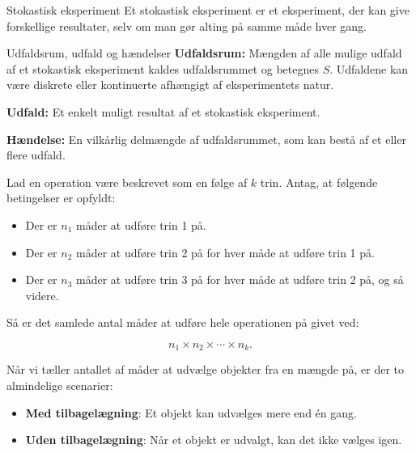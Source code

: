 \begin{definition}{Stokastisk eksperiment}
    Et stokastisk eksperiment er et eksperiment, der kan give forskellige resultater, selv om man gør alting på samme måde hver gang.
\end{definition}

\begin{definition}{Udfaldsrum, udfald og hændelser}
    \textbf{Udfaldsrum:} Mængden af alle mulige udfald af et stokastisk eksperiment kaldes udfaldsrummet og betegnes \( S \). Udfaldene kan være diskrete eller kontinuerte afhængigt af eksperimentets natur.
    
    \textbf{Udfald:} Et enkelt muligt resultat af et stokastisk eksperiment.
    
    \textbf{Hændelse:} En vilkårlig delmængde af udfaldsrummet, som kan bestå af et eller flere udfald.
\end{definition}

\begin{theorem}[Multiplikationsreglen]
    Lad en operation være beskrevet som en følge af $k$ trin. Antag, at følgende betingelser er opfyldt:
    
    \begin{itemize}
        \item Der er $n_1$ måder at udføre trin 1 på.
        \item Der er $n_2$ måder at udføre trin 2 på for hver måde at udføre trin 1 på.
        \item Der er $n_3$ måder at udføre trin 3 på for hver måde at udføre trin 2 på, og så videre.
    \end{itemize}
    
    Så er det samlede antal måder at udføre hele operationen på givet ved:
    
    \[
    n_1 \times n_2 \times \cdots \times n_k.
    \]
\end{theorem}

\begin{definition}
    Når vi tæller antallet af måder at udvælge objekter fra en mængde på, er der to almindelige scenarier:

    \begin{itemize}
        \item \textbf{Med tilbagelægning}: Et objekt kan udvælges mere end én gang.
        \item \textbf{Uden tilbagelægning}: Når et objekt er udvalgt, kan det ikke vælges igen.
    \end{itemize}
\end{definition}

